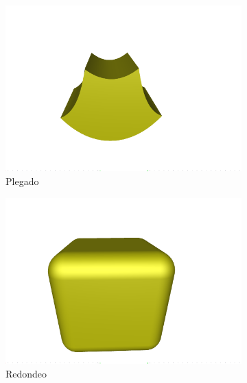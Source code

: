 \begin{figure}[ht!]
    \hfill
    \begin{subfigure}[b]{0.30\textwidth}
        \centering
        \includegraphics[width=\textwidth]{Plantilla-TFG-master/img/deform_bend.png}
        \caption{Plegado}
    \end{subfigure}
    \hfill
    \begin{subfigure}[b]{0.30\textwidth}
        \centering
        \includegraphics[width=\textwidth]{Plantilla-TFG-master/img/deform_round.png}
        \caption{Redondeo}
    \end{subfigure}
    \hfill
    \begin{subfigure}[b]{0.30\textwidth}
        \centering

\end{subfigure}
\end{figure}
